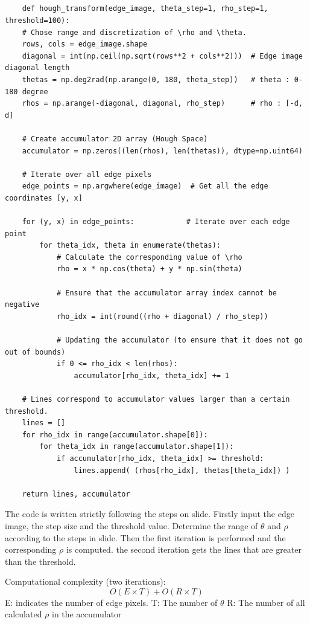 \documentclass[12pt]{article}
\begin{document}
\subsection{}
\begin{lstlisting}
    def hough_transform(edge_image, theta_step=1, rho_step=1, threshold=100):
    # Chose range and discretization of \rho and \theta.
    rows, cols = edge_image.shape
    diagonal = int(np.ceil(np.sqrt(rows**2 + cols**2)))  # Edge image diagonal length
    thetas = np.deg2rad(np.arange(0, 180, theta_step))   # theta : 0-180 degree
    rhos = np.arange(-diagonal, diagonal, rho_step)      # rho : [-d, d]
    
    # Create accumulator 2D array (Hough Space)
    accumulator = np.zeros((len(rhos), len(thetas)), dtype=np.uint64)
    
    # Iterate over all edge pixels
    edge_points = np.argwhere(edge_image)  # Get all the edge coordinates [y, x]
    
    for (y, x) in edge_points:            # Iterate over each edge point
        for theta_idx, theta in enumerate(thetas):  
            # Calculate the corresponding value of \rho
            rho = x * np.cos(theta) + y * np.sin(theta)
            
            # Ensure that the accumulator array index cannot be negative
            rho_idx = int(round((rho + diagonal) / rho_step))
            
            # Updating the accumulator (to ensure that it does not go out of bounds)
            if 0 <= rho_idx < len(rhos):
                accumulator[rho_idx, theta_idx] += 1
    
    # Lines correspond to accumulator values larger than a certain threshold.
    lines = []
    for rho_idx in range(accumulator.shape[0]):
        for theta_idx in range(accumulator.shape[1]):
            if accumulator[rho_idx, theta_idx] >= threshold:
                lines.append( (rhos[rho_idx], thetas[theta_idx]) )
    
    return lines, accumulator
\end{lstlisting}
The code is written strictly following the steps on slide.
Firstly input the edge image, the step size and the threshold value. Determine the range of $ \theta $ and $ \rho $ according to the steps in slide.
Then the first iteration is performed and the corresponding $ \rho $ is computed. the second iteration gets the lines that are greater than the threshold.


Computational complexity (two iterations): 
\[ O(E \times T) + O(R \times T) \]
E: indicates the number of edge pixels.
T: The number of $ \theta $
R: The number of all calculated $ \rho $ in the accumulator
\end{document}
